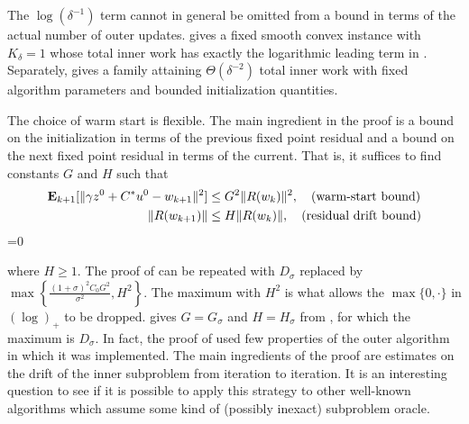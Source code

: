 \documentclass[11pt]{article}
\makeatletter
\newif\ifautonum@forceNumbers
\newif\ifautonum@subeq@rollback
\renewenvironment{subequations}{\autonum@subequationsOld}{%
    \ifautonum@forceNumbers\else\ifnum\value{equation}=0 \autonum@subeq@rollbacktrue\fi\fi %
    \autonum@endsubequationsOld
    \ifautonum@subeq@rollback\addtocounter{equation}{-1}\fi %
  }%
\makeatother
\begin{document}
\begin{remark}
    The $\log(\delta^{-1})$ term cannot in general be omitted from a bound in terms of the actual number of outer updates.
     gives a fixed smooth convex instance with $K_\delta=1$ whose total inner work has exactly the logarithmic leading term in .
    Separately,  gives a family attaining $\Theta(\delta^{-2})$ total inner work with fixed algorithm parameters and bounded initialization quantities.
\end{remark}

The choice of warm start is flexible.
The main ingredient in the proof is a bound on the initialization in terms of the previous fixed point residual and a bound on the next fixed point residual in terms of the current.
That is, it suffices to find constants $G$ and $H$ such that 
\begin{subequations}
    \begin{align}
        {\bf E{}}_{k+1}[\lVert\gamma z^0 + {C}^* u^0 - w_{k+1}\rVert^2] &\leq G^2\lVert R(w_k)\rVert^2, \quad \text{(warm-start bound)}\\
        \lVert R(w_{k+1})\rVert &\leq H\lVert R(w_k)\rVert, \quad \text{(residual drift bound)}
    \end{align}
\end{subequations}
where $H\geq 1$.
The proof of  can be repeated with $D_\sigma$ replaced by $\max\left\{ \frac{(1+\sigma)^2C_0G^2}{\sigma^2}, H^2 \right\}$.
The maximum with $H^2$ is what allows the $\max\{0,\cdot\}$ in $( \log )_+$ to be dropped.
 gives $G = G_\sigma$ and $H = H_\sigma$ from , for which the maximum is $D_\sigma$.
In fact, the proof of  used few properties of the outer algorithm in which it was implemented.
The main ingredients of the proof are estimates on the drift of the inner subproblem from iteration to iteration.
It is an interesting question to see if it is possible to apply this strategy to other well-known algorithms which assume some kind of (possibly inexact) subproblem oracle.
\end{document}
